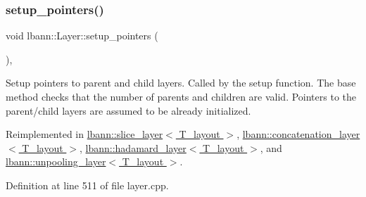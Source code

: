 \mbox{\label{classlbann_1_1Layer_a71b7a62afd9b73c23b2c0267b8ba0981}} 
\subsubsection{\texorpdfstring{setup\+\_\+pointers()}{setup\_pointers()}}
{\footnotesize\ttfamily void lbann\+::\+Layer\+::setup\+\_\+pointers (\begin{DoxyParamCaption}{ }\end{DoxyParamCaption})\hspace{0.3cm}{\ttfamily [protected]}, {\ttfamily [virtual]}}

Setup pointers to parent and child layers. Called by the setup function. The base method checks that the number of parents and children are valid. Pointers to the parent/child layers are assumed to be already initialized. 

Reimplemented in \hyperlink{classlbann_1_1slice__layer_a701854f5906a25c58d4f9d851b20de29}{lbann\+::slice\+\_\+layer$<$ T\+\_\+layout $>$}, \hyperlink{classlbann_1_1concatenation__layer_a20c1588e7a506bc7b0acb4d63586ece9}{lbann\+::concatenation\+\_\+layer$<$ T\+\_\+layout $>$}, \hyperlink{classlbann_1_1hadamard__layer_a712faa83429f6a77a6c43c8afde4ddaa}{lbann\+::hadamard\+\_\+layer$<$ T\+\_\+layout $>$}, and \hyperlink{classlbann_1_1unpooling__layer_a32da9e26ce50aa3df3ecc52691bd5e4f}{lbann\+::unpooling\+\_\+layer$<$ T\+\_\+layout $>$}.



Definition at line 511 of file layer.\+cpp.


